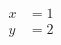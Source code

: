 \documentclass{article}
\begin{document}
\begin{align}  %
x &= 1 \\
y &= 2
\end{align}
\end{document}
